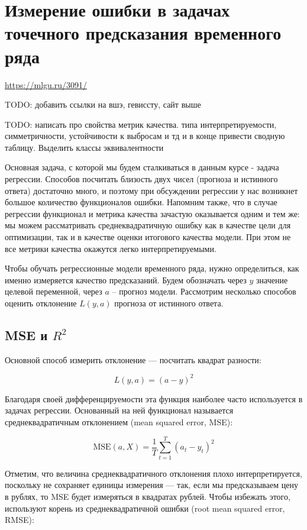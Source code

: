 \section{Измерение ошибки в задачах точечного предсказания временного ряда}

\url{https://mlgu.ru/3091/}

TODO: добавить ссылки на вшэ, гевиссту, сайт выше

TODO: написать про свойства метрик качества. типа интерпретируемости,
симметричности, устойчивости к выбросам и тд и в конце привести
сводную таблицу. Выделить классы эквивалентности

Основная задача, с которой мы будем сталкиваться в данным курсе -
задача регрессии. Способов посчитать близость двух чисел
(прогноза и истинного ответа) достаточно много, и поэтому при
обсуждении регрессии у нас возникнет большое количество функционалов ошибки.
Напомним также, что в случае регрессии функционал и метрика качества
зачастую оказывается одним и тем же: мы можем рассматривать
среднеквадратичную ошибку как в качестве цели для оптимизации, так
и в качестве оценки итогового качества модели. При этом не все
метрики качества окажутся легко интерпретируемыми.

Чтобы обучать регрессионные модели временного ряда, нужно
определиться, как именно измеряется качество предсказаний. Будем
обозначать через \( y \) значение целевой переменной, через \( a \) --
прогноз модели.
Рассмотрим несколько способов оценить отклонение \( L(y, a) \)
прогноза от истинного ответа.

\subsection*{MSE и \( R^2 \)}
Основной способ измерить отклонение — посчитать квадрат разности:

\[ L(y, a) = (a - y)^2 \]

Благодаря своей дифференцируемости эта функция наиболее часто
используется в задачах регрессии. Основанный на ней функционал
называется среднеквадратичным отклонением (mean squared error, MSE):

\[ \text{MSE}(a, X) = \frac{1}{T} \sum_{t=1}^{T} (a_t - y_t)^2 \]

Отметим, что величина среднеквадратичного отклонения плохо
интерпретируется, поскольку не сохраняет единицы измерения — так,
если мы предсказываем цену в рублях, то MSE будет измеряться в
квадратах рублей. Чтобы избежать этого, используют корень из
среднеквадратичной ошибки (root mean squared error, RMSE):


